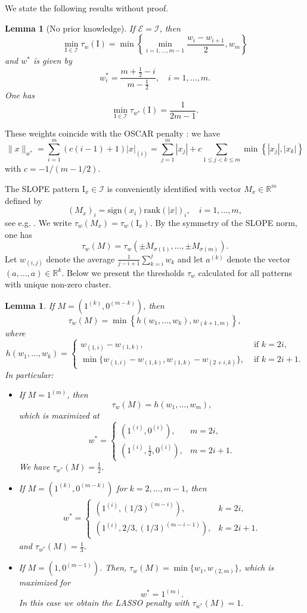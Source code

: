 \documentclass[12pt]{amsart}
\numberwithin{equation}{section}
\numberwithin{equation}{section}
\newtheorem{lemma}[thm]{Lemma}
\theoremstyle{definition}
\newcommand{\R}{\mathbb{R}}
\newcommand{\I}{\mathrm{I}}
\begin{document}
We state the following results without proof.

\begin{lemma}[No prior knowledge]\label{lem:D1}
If $\mathcal{E}=\mathcal{I}$, then 
	\[
	\min_{\I\in\mathcal{I}} \tau_w(\I) = \min \left\{\min_{i=1,\ldots,m-1}  \frac{w_i-w_{i+1}}{2} ,w_m\right\}
	\]
and $w^\ast$ is given by
	\[
	w_i^\ast = \frac{m+\frac12-i}{m-\frac12}, \quad i=1,\ldots,m.
	\]
	One has 
	\[
	\min_{\I\in\mathcal{I}} \tau_{w^\ast}(\I)  = \frac{1}{2m-1}.
	\]
\end{lemma}
These weights coincide with the OSCAR penalty \cite{OSCAR08}: we have
\[
\|x\|_{w^\ast} = \sum_{i=1}^m(c(i-1)+1)|x|_{(i)}= \sum_{j=1}^m |x_j| + c \sum_{1\leq j<k\leq m} \min\left\{ |x_j|, |x_k|\right\}
\]
with $c=-1/(m-1/2)$. 


The SLOPE pattern $\I_x\in \mathcal{I}$ is conveniently identified with vector $M_x\in\R^m$ defined by 
\[
(M_x)_i = \mathrm{sign}(x_i )\mathrm{rank}(|x|)_i,\quad i=1,\ldots,m,
\]
see e.g. \cite[Definition 2.1]{7aut}. We write $\tau_w(M_x)=\tau_w(\I_x)$. By the symmetry of the SLOPE norm, one has 
\[
\tau_w(M) = \tau_w( \pm M_{\sigma(1)},\ldots, \pm M_{\sigma(m)}). 
\]
Let $w_{(i,j)}$ denote the average $\frac{1}{j-i+1} \sum_{k=i}^j w_k$ and let $a^{(k)}$ denote the vector $(a,\ldots,a)\in\R^k$.  Below we present the thresholds $\tau_w$ calculated for all patterns with unique non-zero cluster.

\begin{lemma}\label{lem:SLOPEtuning}
	If $M=(1^{(k)}, 0^{(m-k)})$, then 
	\[
	\tau_w(M) = \min\left\{ h(w_1,\ldots,w_k), w_{(k+1,m)}\right\},
	\]
	where 
	\[
	h(w_1,\ldots,w_k) = \begin{cases}
		w_{(1,i)} - w_{(1,k)}, & \mbox{ if }k=2i,\\
		\min\{ w_{(1,i)} - w_{(1,k)}, w_{(1,k)} - w_{(2+i,k)}\}, & \mbox{ if }k=2i+1.
	\end{cases}
	\]
In particular:
\begin{itemize}
	\item If $M=1^{(m)}$, then 
	\[
	\tau_w(M) = h(w_1,\ldots,w_m),
	\]
	which is maximized at  
	\[
	w^\ast = \begin{cases}
		(1^{(i)},0^{(i)}), & m=2i, \\
		(1^{(i)}, \frac12, 0^{(i)}), & m=2i+1.
	\end{cases}
	\]
	We have $\tau_{w^\ast}(M) = \frac12$.
	\item If $M=(1^{(k)}, 0^{(m-k)})$ for $k=2,\ldots,m-1$, then 
	\begin{align*}
		w^\ast = \begin{cases}
			( 1^{(i)}, (1/3)^{(m-i)} ), & k=2i, \\
			( 1^{(i)}, 2/3, (1/3)^{(m-i-1)} ) , & k=2i+1.
		\end{cases}
	\end{align*}
	and $\tau_{w^\ast}(M) = \frac13$. 
	\item If $M=(1, 0^{(m-1)})$. Then, $\tau_w(M) = \min\{w_1, w_{(2,m)}\}$, which is maximized for 
	\[
	w^\ast=1^{(m)}.
	\] 
	In this case we obtain the LASSO penalty with $\tau_{w^\ast}(M)=1$.
	\end{itemize}
\end{lemma}
\end{document}
